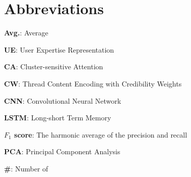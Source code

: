 \documentclass{bmcart}
\begin{document}
\section*{Abbreviations}
\begin{flushleft}
\textbf{Avg.}: Average

\textbf{UE}: User Expertise Representation

\textbf{CA}: Cluster-sensitive Attention

\textbf{CW}: Thread Content Encoding with Credibility Weights

\textbf{CNN}: Convolutional Neural Network

\textbf{LSTM}: Long-short Term Memory

\textbf{$F_1$ score}: The harmonic average of the precision and recall

\textbf{PCA}: Principal Component Analysis

\textbf{\#}: Number of
\end{flushleft}




\end{document}
